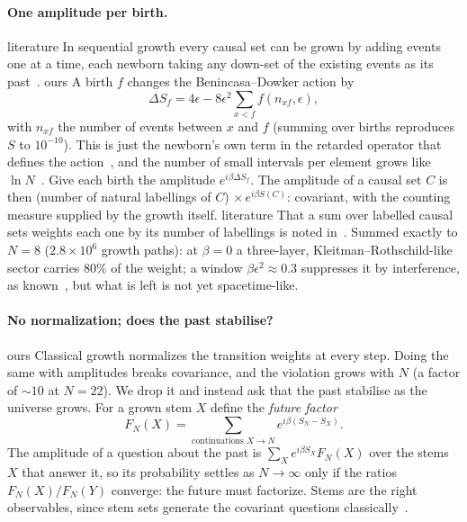 \documentclass[11pt,a4paper]{article}
\newcommand{\tagbox}[2]{\textsf{\scriptsize\colorbox{#1!12}{\textcolor{#1!70!black}{#2}}}}
\newcommand{\lit}{\tagbox{blue}{literature}}
\newcommand{\ours}{\tagbox{orange}{ours}}
\begin{document}
\paragraph{One amplitude per birth.}
\lit{} In sequential growth every causal set can be grown by adding events one at a time, each newborn taking any down-set of the existing events as its past~\cite{RideoutSorkin00}. \ours{} A birth $f$ changes the Benincasa--Dowker action by
\begin{equation}
\Delta S_f = 4\epsilon - 8\epsilon^2\sum_{x<f} f(n_{xf},\epsilon),
\label{eq:dS}
\end{equation}
with $n_{xf}$ the number of events between $x$ and $f$ (summing over births reproduces $S$ to $10^{-10}$). This is just the newborn's own term in the retarded operator that defines the action~\cite{BD10}, and the number of small intervals per element grows like $\ln N$~\cite{GlaserSurya13}. Give each birth the amplitude $e^{i\beta\Delta S_f}$. The amplitude of a causal set $C$ is then (number of natural labellings of $C$)$\,\times e^{i\beta S(C)}$: covariant, with the counting measure supplied by the growth itself. \lit{} That a sum over labelled causal sets weights each one by its number of labellings is noted in~\cite[§6.4]{Surya19}. Summed exactly to $N=8$ ($2.8\times10^6$ growth paths): at $\beta=0$ a three-layer, Kleitman--Rothschild-like sector carries $80\%$ of the weight; a window $\beta\epsilon^2\approx0.3$ suppresses it by interference, as known~\cite{LoomisCarlip18}, but what is left is not yet spacetime-like.

\paragraph{No normalization; does the past stabilise?} \ours{} Classical growth normalizes the transition weights at every step. Doing the same with amplitudes breaks covariance, and the violation grows with $N$ (a factor of $\sim10$ at $N=22$). We drop it and instead ask that the past stabilise as the universe grows. For a grown stem $X$ define the \emph{future factor}
\begin{equation}
F_N(X)=\sum_{\text{continuations }X\to N}e^{i\beta(S_N-S_X)} .
\end{equation}
The amplitude of a question about the past is $\sum_{X}e^{i\beta S_X}F_N(X)$ over the stems $X$ that answer it, so its probability settles as $N\to\infty$ only if the ratios $F_N(X)/F_N(Y)$ converge: the future must factorize. Stems are the right observables, since stem sets generate the covariant questions classically~\cite{BDGHS03}.
\end{document}
